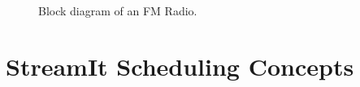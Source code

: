 \documentclass{sig-alt-full}
\begin{document}
\begin{figure}[t]
\begin{center}
\hspace{0.1in} 
\vspace{-24pt} \caption{\protect\small Block diagram of an FM
Radio. \protect\label{fig:radio-ascoded}}
\vspace{-18pt}
\end{center}
\end{figure}




\section{StreamIt Scheduling Concepts}
\label{chpt:sched-basic}
\end{document}
